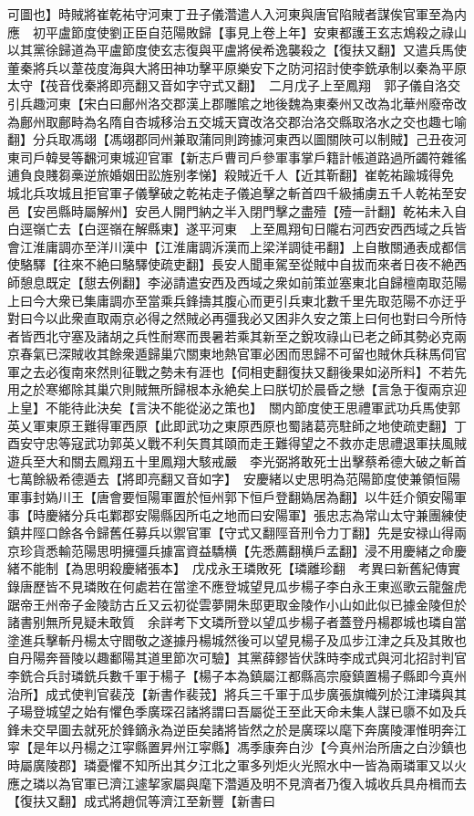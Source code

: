 可圖也】時賊將崔乾祐守河東丁丑子儀濳遣人入河東與唐官陷賊者謀俟官軍至為内應　初平盧節度使劉正臣自范陽敗歸【事見上卷上年】安東都護王玄志鴆殺之祿山以其黨徐歸道為平盧節度使玄志復與平盧將侯希逸襲殺之【復扶又翻】又遣兵馬使董秦將兵以葦茷度海與大將田神功擊平原樂安下之防河招討使李銑承制以秦為平原太守【茷音伐秦將即亮翻又音如字守式又翻】　二月戊子上至鳳翔　郭子儀自洛交引兵趣河東【宋白曰鄜州洛交郡漢上郡雕隂之地後魏為東秦州又改為北華州廢帝改為鄜州取鄜畤為名隋自杏城移治五交城天寶改洛交郡治洛交縣取洛水之交也趣七喻翻】分兵取馮翊【馮翊郡同州兼取蒲同則跨據河東西以圖關陜可以制賊】己丑夜河東司戶韓旻等飜河東城迎官軍【新志戶曹司戶參軍事掌戶籍計帳道路過所蠲符雜徭逋負良賤芻槀逆旅婚姻田訟旌别孝悌】殺賊近千人【近其靳翻】崔乾祐踰城得免城北兵攻城且拒官軍子儀擊破之乾祐走子儀追擊之斬首四千級捕虜五千人乾祐至安邑【安邑縣時屬解州】安邑人開門納之半入閉門擊之盡殪【殪一計翻】乾祐未入自白逕嶺亡去【白逕嶺在解縣東】遂平河東　上至鳳翔旬日隴右河西安西西域之兵皆會江淮庸調亦至洋川漢中【江淮庸調泝漢而上梁洋調徒弔翻】上自散關通表成都信使駱驛【往來不絶曰駱驛使疏吏翻】長安人聞車駕至從賊中自拔而來者日夜不絶西師憩息既定【憇去例翻】李泌請遣安西及西域之衆如前策並塞東北自歸檀南取范陽上曰今大衆已集庸調亦至當乘兵鋒擣其腹心而更引兵東北數千里先取范陽不亦迂乎對曰今以此衆直取兩京必得之然賊必再彊我必又困非久安之策上曰何也對曰今所恃者皆西北守塞及諸胡之兵性耐寒而畏暑若乘其新至之銳攻祿山已老之師其勢必克兩京春氣已深賊收其餘衆遁歸巢穴關東地熱官軍必困而思歸不可留也賊休兵秣馬伺官軍之去必復南來然則征戰之勢未有涯也【伺相吏翻復扶又翻後果如泌所料】不若先用之於寒鄉除其巢穴則賊無所歸根本永絶矣上曰朕切於晨昏之戀【言急于復兩京迎上皇】不能待此決矣【言決不能從泌之策也】　關内節度使王思禮軍武功兵馬使郭英乂軍東原王難得軍西原【此即武功之東原西原也蜀諸葛亮駐師之地使疏吏翻】丁酉安守忠等寇武功郭英乂戰不利矢貫其頤而走王難得望之不救亦走思禮退軍扶風賊遊兵至大和關去鳳翔五十里鳳翔大駭戒嚴　李光弼將敢死士出擊蔡希德大破之斬首七萬餘級希德遁去【將即亮翻又音如字】　安慶緒以史思明為范陽節度使兼領恒陽軍事封媯川王【唐會要恒陽軍置於恒州郭下恒戶登翻媯居為翻】以牛廷介領安陽軍事【時慶緒分兵屯鄴郡安陽縣因所屯之地而曰安陽軍】張忠志為常山太守兼團練使鎮井陘口餘各令歸舊任募兵以禦官軍【守式又翻陘音刑令力丁翻】先是安禄山得兩京珍貨悉輸范陽思明擁彊兵據富資益驕横【先悉薦翻横戶孟翻】浸不用慶緒之命慶緒不能制【為思明殺慶緒張本】　戊戍永王璘敗死【璘離珍翻　考異曰新舊紀傳實錄唐歷皆不見璘敗在何處若在當塗不應登城望見瓜步楊子李白永王東巡歌云龍盤虎踞帝王州帝子金陵訪古丘又云初從雲夢開朱邸更取金陵作小山如此似已據金陵但於諸書别無所見疑未敢質　余詳考下文璘所登以望瓜步楊子者蓋登丹楊郡城也璘自當塗進兵擊斬丹楊太守閻敬之遂據丹楊城然後可以望見楊子及瓜步江津之兵及其敗也自丹陽奔晉陵以趣鄱陽其道里節次可驗】其黨薛鏐皆伏誅時李成式與河北招討判官李銑合兵討璘銑兵數千軍于楊子【楊子本為鎮屬江都縣高宗廢鎮置楊子縣即今真州治所】成式使判官裴茂【新書作裴茙】將兵三千軍于瓜步廣張旗幟列於江津璘與其子瑒登城望之始有懼色季廣琛召諸將謂曰吾屬從王至此天命未集人謀已隳不如及兵鋒未交早圖去就死於鋒鏑永為逆臣矣諸將皆然之於是廣琛以麾下奔廣陵渾惟明奔江寜【是年以丹楊之江寜縣置昇州江寜縣】馮季康奔白沙【今真州治所唐之白沙鎮也時屬廣陵郡】璘憂懼不知所出其夕江北之軍多列炬火光照水中一皆為兩璘軍又以火應之璘以為官軍已濟江遽挈家屬與麾下濳遁及明不見濟者乃復入城收兵具舟楫而去【復扶又翻】成式將趙侃等濟江至新豐【新書曰